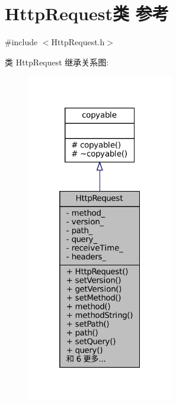 \hypertarget{classmuduo_1_1net_1_1HttpRequest}{}\section{Http\+Request类 参考}
\label{classmuduo_1_1net_1_1HttpRequest}


{\ttfamily \#include $<$Http\+Request.\+h$>$}



类 Http\+Request 继承关系图\+:
\nopagebreak
\begin{figure}[H]
\begin{center}
\leavevmode
\includegraphics[width=181pt]{classmuduo_1_1net_1_1HttpRequest__inherit__graph}
\end{center}
\end{figure}


